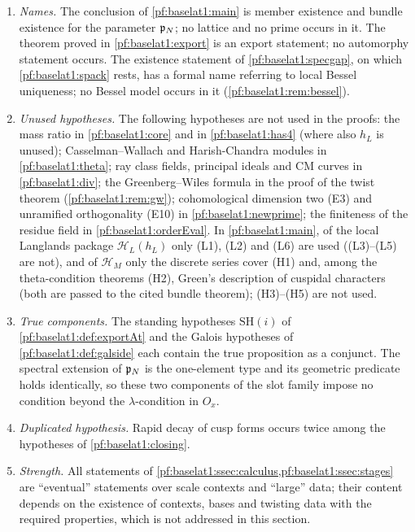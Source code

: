\begin{remark}\label{pf:baselat1:rem:summary}
\begin{enumerate}[label=(\arabic*)]
\item \emph{Names.} The conclusion of \cref{pf:baselat1:main} is member existence and bundle existence for the parameter
  $\mathfrak p_N$; no lattice and no prime occurs in it. The theorem proved in \cref{pf:baselat1:export} is an export
  statement; no automorphy statement occurs. The existence statement of \cref{pf:baselat1:specgap}, on which \cref{pf:baselat1:spack} rests, has a
  formal name referring to local Bessel uniqueness; no Bessel model occurs in it (\cref{pf:baselat1:rem:bessel}).
\item \emph{Unused hypotheses.} The following hypotheses are not used in the proofs: the mass ratio in
  \cref{pf:baselat1:core} and in \cref{pf:baselat1:has4} (where also $h_L$ is unused); Casselman--Wallach and
  Harish-Chandra modules in \cref{pf:baselat1:theta}; ray class fields, principal ideals and CM curves in
  \cref{pf:baselat1:div}; the Greenberg--Wiles formula in the proof of the twist theorem
  (\cref{pf:baselat1:rem:gw}); cohomological dimension two (E3) and unramified orthogonality (E10) in
  \cref{pf:baselat1:newprime}; the finiteness of the residue field in \cref{pf:baselat1:orderEval}. In
  \cref{pf:baselat1:main}, of the local Langlands package $\mathcal H_L(h_L)$ only (L1), (L2) and (L6) are used
  ((L3)--(L5) are not), and of $\mathcal H_M$ only the discrete series cover (H1) and, among the
  theta-condition theorems (H2), Green's description of cuspidal characters (both are passed to the cited bundle
  theorem); (H3)--(H5) are not used.
\item \emph{True components.} The standing hypotheses $\mathrm{SH}(i)$ of \cref{pf:baselat1:def:exportAt} and the
  Galois hypotheses of \cref{pf:baselat1:def:galside} each contain the true proposition as a conjunct. The spectral
  extension of $\mathfrak p_N$ is the one-element type and its geometric predicate holds identically, so these two
  components of the slot family impose no condition beyond the $\lambda$-condition in $O_x$.
\item \emph{Duplicated hypothesis.} Rapid decay of cusp forms occurs twice among the hypotheses of
  \cref{pf:baselat1:closing}.
\item \emph{Strength.} All statements of \cref{pf:baselat1:ssec:calculus,pf:baselat1:ssec:stages} are ``eventual''
  statements over scale contexts and ``large'' data; their content depends on the existence of contexts, bases and
  twisting data with the required properties, which is not addressed in this section.
\end{enumerate}
\end{remark}

